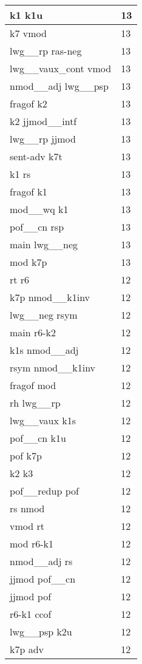 \documentclass[a4 paper]{article}
\begin{document}
\begin{longtable}{p{}p{}}
k1 k1u  & 13 \\ \midrule
k7 vmod  & 13 \\ \midrule
lwg\_\_rp ras-neg  & 13 \\ \midrule
lwg\_\_vaux\_cont vmod  & 13 \\ \midrule
nmod\_\_adj lwg\_\_psp  & 13 \\ \midrule
fragof k2  & 13 \\ \midrule
k2 jjmod\_\_intf  & 13 \\ \midrule
lwg\_\_rp jjmod  & 13 \\ \midrule
sent-adv k7t  & 13 \\ \midrule
k1 rs  & 13 \\ \midrule
fragof k1  & 13 \\ \midrule
mod\_\_wq k1  & 13 \\ \midrule
pof\_\_cn rsp  & 13 \\ \midrule
main lwg\_\_neg  & 13 \\ \midrule
mod k7p  & 13 \\ \midrule
rt r6  & 12 \\ \midrule
k7p nmod\_\_k1inv  & 12 \\ \midrule
lwg\_\_neg rsym  & 12 \\ \midrule
main r6-k2  & 12 \\ \midrule
k1s nmod\_\_adj  & 12 \\ \midrule
rsym nmod\_\_k1inv  & 12 \\ \midrule
fragof mod  & 12 \\ \midrule
rh lwg\_\_rp  & 12 \\ \midrule
lwg\_\_vaux k1s  & 12 \\ \midrule
pof\_\_cn k1u  & 12 \\ \midrule
pof k7p  & 12 \\ \midrule
k2 k3  & 12 \\ \midrule
pof\_\_redup pof  & 12 \\ \midrule
rs nmod  & 12 \\ \midrule
vmod rt  & 12 \\ \midrule
mod r6-k1  & 12 \\ \midrule
nmod\_\_adj rs  & 12 \\ \midrule
jjmod pof\_\_cn  & 12 \\ \midrule
jjmod pof  & 12 \\ \midrule
r6-k1 ccof  & 12 \\ \midrule
lwg\_\_psp k2u  & 12 \\ \midrule
k7p adv  & 12 \\ \midrule

\end{longtable}
\end{document}
